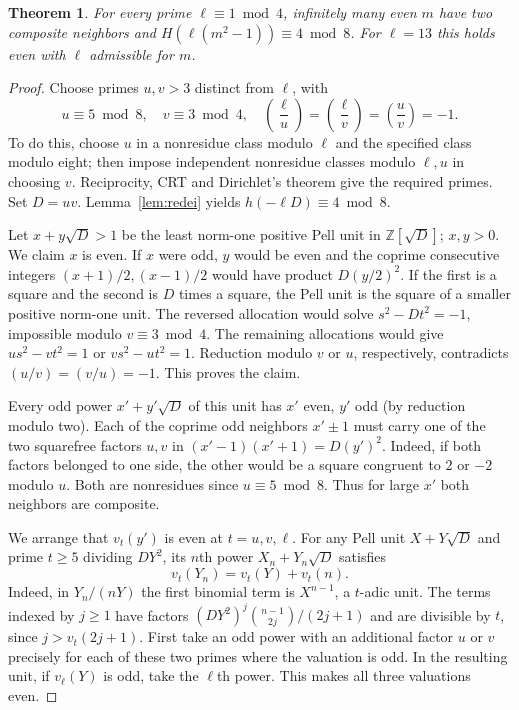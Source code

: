 \documentclass[11pt]{article}
\newtheorem{theorem}{Theorem}
\newcommand{\leg}[2]{\left(\frac{#1}{#2}\right)}
\begin{document}
\begin{theorem}\label{th:pell}
For every prime $\ell\equiv1\bmod4$, infinitely many even $m$
have two composite neighbors and $H(\ell(m^2-1))\equiv4\bmod8$.
For $\ell=13$ this holds even with $\ell$ admissible for $m$.
\end{theorem}
\begin{proof}
Choose primes $u,v>3$ distinct from $\ell$, with
\[
 u\equiv5\bmod8,\quad v\equiv3\bmod4,\quad
 \leg{\ell}{u}=\leg{\ell}{v}=\leg{u}{v}=-1 .
\]
To do this, choose $u$ in a nonresidue class modulo $\ell$ and the
specified class modulo eight; then impose independent nonresidue
classes modulo $\ell,u$ in choosing $v$. Reciprocity, CRT and
Dirichlet's theorem give the required primes. Set $D=uv$.
Lemma~\ref{lem:redei} yields $h(-\ell D)\equiv4\bmod8$.

Let $x+y\sqrt D>1$ be the least norm-one positive Pell unit in
$\mathbb Z[\sqrt D]$; $x,y>0$. We claim $x$ is even. If $x$ were odd,
$y$ would be even and the coprime consecutive integers
$(x+1)/2,(x-1)/2$ would have product $D(y/2)^2$.
If the first is a square and the second is $D$ times a square, the
Pell unit is the square of a smaller positive norm-one unit.
The reversed allocation would solve $s^2-Dt^2=-1$, impossible
modulo $v\equiv3\bmod4$. The remaining allocations would give
$u s^2-vt^2=1$ or $v s^2-ut^2=1$. Reduction modulo $v$ or $u$,
respectively, contradicts $(u/v)=(v/u)=-1$. This proves the claim.

Every odd power $x'+y'\sqrt D$ of this unit has $x'$ even, $y'$ odd
(by reduction modulo two). Each of the coprime odd neighbors $x'\pm1$
must carry one of the two squarefree factors $u,v$ in
$(x'-1)(x'+1)=D(y')^2$. Indeed, if both factors belonged to one side,
the other would be a square congruent to $2$ or $-2$ modulo $u$.
Both are nonresidues since $u\equiv5\bmod8$. Thus for large $x'$ both
neighbors are composite.

We arrange that $v_t(y')$ is even at $t=u,v,\ell$. For any Pell unit
$X+Y\sqrt D$ and prime $t\ge5$ dividing $DY^2$, its $n$th power
$X_n+Y_n\sqrt D$ satisfies
\[
 v_t(Y_n)=v_t(Y)+v_t(n).
\]
Indeed, in $Y_n/(nY)$ the first binomial term is $X^{n-1}$,
a $t$-adic unit. The terms indexed by $j\ge1$ have factors
$(DY^2)^j\binom{n-1}{2j}/(2j+1)$ and are divisible by $t$, since
$j>v_t(2j+1)$. First take an odd power with an additional factor
$u$ or $v$ precisely for each of these two primes where the valuation
is odd. In the resulting unit, if $v_\ell(Y)$ is odd, take the
$\ell$th power. This makes all three valuations even.


\end{proof}
\end{document}
